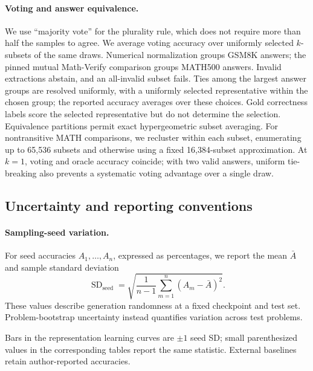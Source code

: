 \documentclass[11pt,letterpaper]{article}
\begin{document}
\paragraph{Voting and answer equivalence.}
We use ``majority vote'' for the plurality rule, which does not require more than half the samples to agree. We average voting accuracy over uniformly selected $k$-subsets of the same draws. Numerical normalization groups GSM8K answers; the pinned mutual Math-Verify comparison groups MATH500 answers. Invalid extractions abstain, and an all-invalid subset fails. Ties among the largest answer groups are resolved uniformly, with a uniformly selected representative within the chosen group; the reported accuracy averages over these choices. Gold correctness labels score the selected representative but do not determine the selection. Equivalence partitions permit exact hypergeometric subset averaging. For nontransitive MATH comparisons, we recluster within each subset, enumerating up to 65,536 subsets and otherwise using a fixed 16,384-subset approximation. At $k=1$, voting and oracle accuracy coincide; with two valid answers, uniform tie-breaking also prevents a systematic voting advantage over a single draw.

\subsection{Uncertainty and reporting conventions}
\label{app:uncertainty}

\paragraph{Sampling-seed variation.}
For seed accuracies $A_1,\ldots,A_n$, expressed as percentages, we report the mean $\bar A$ and sample standard deviation
\[
  \operatorname{SD}_{\mathrm{seed}}=\sqrt{\frac{1}{n-1}\sum_{m=1}^{n}(A_m-\bar A)^2}.
\]
These values describe generation randomness at a fixed checkpoint and test set. Problem-bootstrap uncertainty instead quantifies variation across test problems.

Bars in the representation learning curves are $\pm1$ seed SD; small parenthesized values in the corresponding tables report the same statistic. External baselines retain author-reported accuracies.
\end{document}

